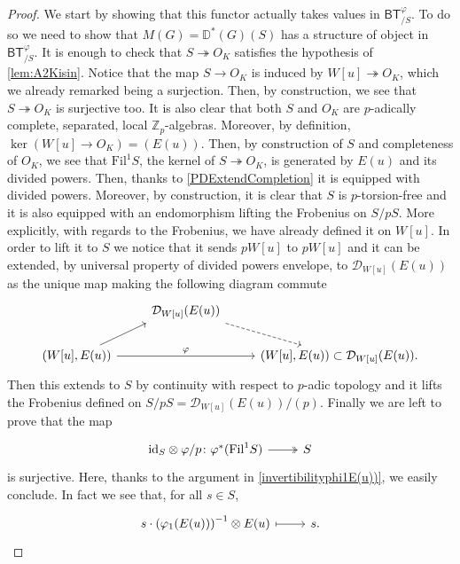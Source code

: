 \begin{proof}\leavevmode\vspace{-.2\baselineskip}
We start by showing that this functor actually takes values in $\mathsf{BT}^{\varphi}_{/S}$.
To do so we need to show that $M(G) = \mathbb{D}^{*}(G)(S)$
has a structure of object in $\mathsf{BT}^{\varphi}_{/S}$.
It is enough to check that $S \twoheadrightarrow O_K$ satisfies
the hypothesis of \cref{lem:A2Kisin}.
Notice that the map $S \to O_K$ is induced by $W[u] \twoheadrightarrow O_K$,
which we already remarked being a surjection.
Then, by construction, we see that $S \twoheadrightarrow O_K$
is surjective too.
It is also clear that both $S$ and $O_K$ are 
$p$-adically complete, separated, local $\mathbb{Z}_{p}$-algebras.
Moreover, by definition, $\ker (W[u] \to O_K) = (E(u))$.
Then, by construction of $S$ and completeness of $O_K$,
we see that $\mathrm{Fil}^1 S$, the kernel of $S \twoheadrightarrow O_K$, is generated
by $E(u)$ and its divided powers.
Then, thanks to \cref{PDExtendCompletion} it is equipped with divided powers.
Moreover, by construction, it is clear that $S$ is $p$-torsion-free
and it is also equipped with an endomorphism lifting the Frobenius on $S/pS$.
More explicitly, with regards to the Frobenius, we have already defined it on $W[u]$.
In order to lift it to $S$ we notice that it sends $pW[u]$ to $pW[u]$
and it can be extended, by universal property of divided powers envelope,
to $\mathcal{D}_{W[u]}(E(u))$ as the unique map making the following diagram commute
\begin{equation*}
\begin{tikzcd}
	&
	\mathcal{D}_{W[u]}(E(u))
	\arrow[rd, "", dashrightarrow,
	start anchor=south east] & \\
	\left( W[u], E(u)\right) \arrow[ru, "", rightarrow,
	end anchor=south west] 
	\arrow[rr, "\varphi", rightarrow] & &
	\left( W[u], E(u)\right) \subset
	\mathcal{D}_{W[u]}(E(u)). 
\end{tikzcd}
\end{equation*}
Then this extends to $S$ by continuity with respect to $p$-adic
topology and it lifts the Frobenius defined on
$S/pS = \mathcal{D}_{W[u]}(E(u))/ (p)$.
Finally we are left to prove that the map
\begin{equation*}
\begin{tikzcd}[row sep = 0ex
	,/tikz/column 1/.append style={anchor=base east}
	,/tikz/column 2/.append style={anchor=base west}]
	\mathrm{id}_{ S } \otimes \varphi/p \colon 
	\varphi^*(\mathrm{Fil}^1 S) \arrow[r, "", twoheadrightarrow] &
	S
\end{tikzcd}
\end{equation*} 
is surjective.
Here, thanks to the argument in \cref{invertibilityphi1E(u))}, we easily conclude.
In fact we see that, for all $s \in S$,
\begin{equation*}
\begin{tikzcd}[row sep = 0ex
	,/tikz/column 1/.append style={anchor=base east}
	,/tikz/column 2/.append style={anchor=base west}]
	s \cdot \left( \varphi_1(E(u)) \right)^{-1} \otimes E(u) 
	\arrow[r, "", mapsto] & 
	s
.\end{tikzcd}
\end{equation*} 



\end{proof}
